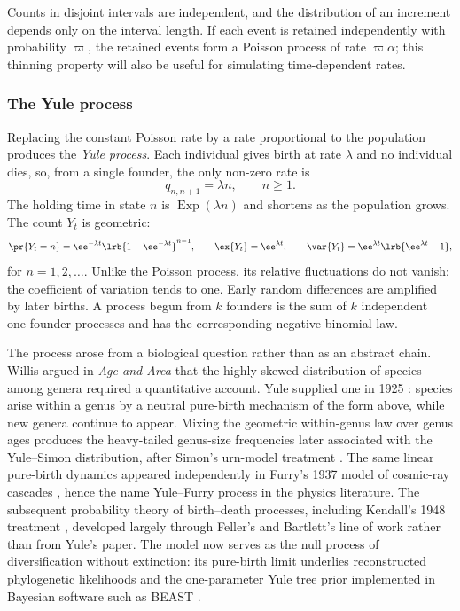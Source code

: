 Counts in disjoint intervals are independent, and the distribution of an
increment depends only on the interval length. If each event is retained
independently with probability $\varpi$, the retained events form a Poisson
process of rate $\varpi\alpha$; this thinning property will also be useful for
simulating time-dependent rates.

\subsubsection{The Yule process}
\label{m:sec:yule}

Replacing the constant Poisson rate by a rate proportional to the population
produces the \emph{Yule process}. Each individual gives birth at rate
$\lambda$ and no individual dies, so, from a single founder, the only non-zero
rate is
\begin{equation}
\label{m:eq:yulerates}
q_{n,n+1}=\lambda n,
\qquad n\ge1.
\end{equation}
The holding time in state $n$ is $\operatorname{Exp}(\lambda n)$ and shortens
as the population grows. The count $Y_t$ is geometric:
\begin{equation}
\label{m:eq:yulelaw}
\pr{Y_t=n}=\ee^{-\lambda t}
\lrb{1-\ee^{-\lambda t}}^{n-1},
\qquad
\ex{Y_t}=\ee^{\lambda t},
\qquad
\var{Y_t}=\ee^{\lambda t}\lrb{\ee^{\lambda t}-1},
\end{equation}
for $n=1,2,\ldots$. Unlike the Poisson process, its relative fluctuations do
not vanish: the coefficient of variation tends to one. Early random
differences are amplified by later births. A process begun from $k$ founders
is the sum of $k$ independent one-founder processes and has the corresponding
negative-binomial law.

\begin{remark}
\label{m:rem:yuleorigin}
The process arose from a biological question rather than as an abstract
chain. Willis argued in \emph{Age and Area} \cite{Willis1922} that the highly
skewed distribution of species among genera required a quantitative account.
Yule supplied one in 1925 \cite{Yule1925}: species arise within a genus by a
neutral pure-birth mechanism of the form above, while new genera continue to
appear. Mixing the geometric within-genus law over genus ages produces the
heavy-tailed genus-size frequencies later associated with the Yule--Simon
distribution, after Simon's urn-model treatment \cite{Simon1955}. The same
linear pure-birth dynamics appeared independently in Furry's 1937 model of
cosmic-ray cascades \cite{Furry1937}, hence the name Yule--Furry process in
the physics literature. The subsequent probability theory of birth--death
processes, including Kendall's 1948 treatment \cite{Kendall1948}, developed
largely through Feller's and Bartlett's line of work rather than from Yule's
paper. The model now serves as the null process of diversification without
extinction: its pure-birth limit underlies reconstructed phylogenetic
likelihoods \cite{Nee1994} and the one-parameter Yule tree prior implemented
in Bayesian software such as BEAST \cite{Bouckaert2014}.
\end{remark}

